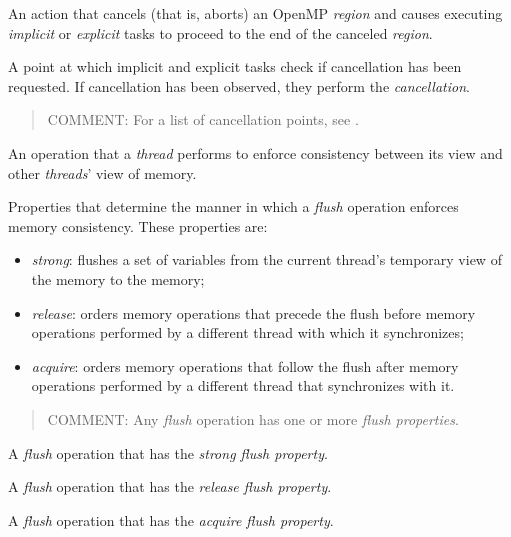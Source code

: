 \glossarydefstart
An action that cancels (that is, aborts) an OpenMP \emph{region} and 
causes executing \emph{implicit} or \emph{explicit} tasks to proceed 
to the end of the canceled \emph{region}.
\glossarydefend

\glossarydefstart
A point at which implicit and explicit tasks check if cancellation has been
requested. If cancellation has been observed, they perform the \emph{cancellation}.

\begin{quote}
COMMENT: For a list of cancellation points, see .
\end{quote}
\glossarydefend
\bigskip

\glossarydefstart
An operation that a \emph{thread} performs to enforce consistency between its
view and other \emph{threads}' view of memory.
\glossarydefend

\glossarydefstart
Properties that determine the manner in which a \emph{flush} operation enforces
memory consistency. These properties are:
\begin{itemize}
    \item \emph{strong}: flushes a set of variables from the current thread's
        temporary view of the memory to the memory;
    \item \emph{release}: orders memory operations that precede the flush
        before memory operations performed by a different thread with which it
        synchronizes;
    \item \emph{acquire}: orders memory operations that follow the flush after
        memory operations performed by a different thread that synchronizes
        with it.
\end{itemize}

\begin{quote}
COMMENT: Any \emph{flush} operation has one or more \emph{flush properties}.
\end{quote}
\glossarydefend

\glossarydefstart
A \emph{flush} operation that has the \emph{strong flush property}.
\glossarydefend

\glossarydefstart
A \emph{flush} operation that has the \emph{release flush property}.
\glossarydefend

\glossarydefstart
A \emph{flush} operation that has the \emph{acquire flush property}.
\glossarydefend

